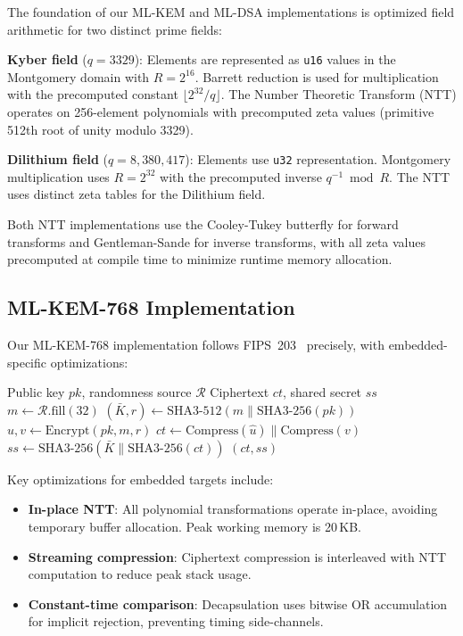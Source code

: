 \documentclass[conference,10pt]{IEEEtran}
\begin{document}
The foundation of our ML-KEM and ML-DSA implementations is optimized field arithmetic for two distinct prime fields:

\textbf{Kyber field} ($q = 3329$): Elements are represented as \texttt{u16} values in the Montgomery domain with $R = 2^{16}$. Barrett reduction is used for multiplication with the precomputed constant $\lfloor 2^{32} / q \rfloor$. The Number Theoretic Transform (NTT) operates on 256-element polynomials with precomputed zeta values (primitive 512th root of unity modulo 3329).

\textbf{Dilithium field} ($q = 8{,}380{,}417$): Elements use \texttt{u32} representation. Montgomery multiplication uses $R = 2^{32}$ with the precomputed inverse $q^{-1} \bmod R$. The NTT uses distinct zeta tables for the Dilithium field.

Both NTT implementations use the Cooley-Tukey butterfly for forward transforms and Gentleman-Sande for inverse transforms, with all zeta values precomputed at compile time to minimize runtime memory allocation.

\subsection{ML-KEM-768 Implementation}

Our ML-KEM-768 implementation follows FIPS~203~\cite{fips203} precisely, with embedded-specific optimizations:

\begin{algorithm}[t]
\caption{ML-KEM-768 Encapsulation (Embedded)}
\label{alg:encaps}
\begin{algorithmic}[1]
\REQUIRE Public key $pk$, randomness source $\mathcal{R}$
\ENSURE Ciphertext $ct$, shared secret $ss$
\STATE $m \gets \mathcal{R}.\text{fill}(32)$ 
\STATE $(\bar{K}, r) \gets \text{SHA3-512}(m \| \text{SHA3-256}(pk))$
\STATE $\hat{u}, v \gets \text{Encrypt}(pk, m, r)$ 
\STATE $ct \gets \text{Compress}(\hat{u}) \| \text{Compress}(v)$
\STATE $ss \gets \text{SHA3-256}(\bar{K} \| \text{SHA3-256}(ct))$
\RETURN $(ct, ss)$
\end{algorithmic}
\end{algorithm}

Key optimizations for embedded targets include:
\begin{itemize}[leftmargin=*]
  \item \textbf{In-place NTT}: All polynomial transformations operate in-place, avoiding temporary buffer allocation. Peak working memory is 20\,KB.
  \item \textbf{Streaming compression}: Ciphertext compression is interleaved with NTT computation to reduce peak stack usage.
  \item \textbf{Constant-time comparison}: Decapsulation uses bitwise OR accumulation for implicit rejection, preventing timing side-channels.
\end{itemize}
\end{document}

